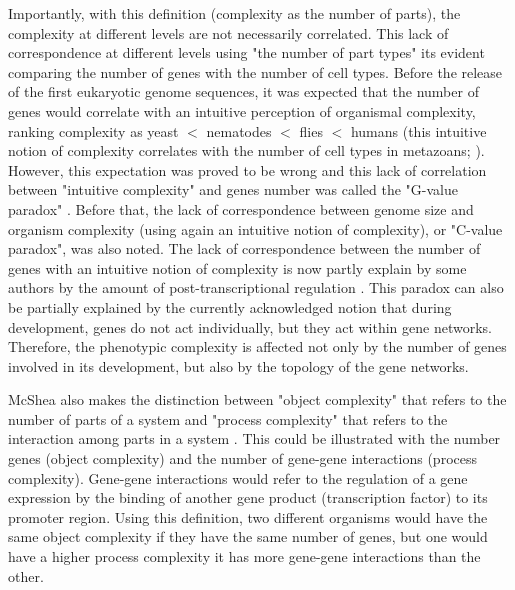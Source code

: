 Importantly, with this definition (complexity as the number of parts), the complexity at different levels are not necessarily correlated.
%
This lack of correspondence at different levels using "the number of part types" its evident comparing the number of genes with the number of cell types. Before the release of the first eukaryotic genome sequences, it was expected that the number of genes would correlate with an intuitive perception of organismal complexity, ranking complexity as yeast $<$ nematodes $<$ flies $<$ humans \citep{Hahn2002} (this intuitive notion of complexity correlates with the number of cell types in metazoans; \citealp{Valentine1994}). However, this expectation was proved to be wrong and this lack of correlation between "intuitive complexity" and genes number was called the "G-value paradox" \citep{Hahn2002}.
Before that, the lack of correspondence between genome size and organism complexity (using again an intuitive notion of complexity),  or "C-value paradox", was also noted.
The lack of correspondence between the number of genes with an intuitive notion of complexity is now partly explain by some authors by the amount of post-transcriptional regulation \citep{Sempere2006}.
This paradox can also be partially explained by the currently acknowledged notion that during development, genes do not act individually, but they act within gene networks. Therefore, the phenotypic complexity is affected not only by the number of genes involved in its development, but also by the topology of the gene networks.

McShea also makes the distinction between "object complexity" that refers to the number of parts of a system and "process complexity" that refers to the interaction among parts in a system \citep{McShea1996}.
This could be illustrated with the number genes (object complexity) and the number of gene-gene interactions (process complexity). Gene-gene interactions would refer to the regulation of a gene expression by the binding of another gene product (transcription factor) to its promoter region.
Using this definition, two different organisms would have the same object complexity if they have the same number of genes, but one would have a higher process complexity it has more gene-gene interactions than the other.


